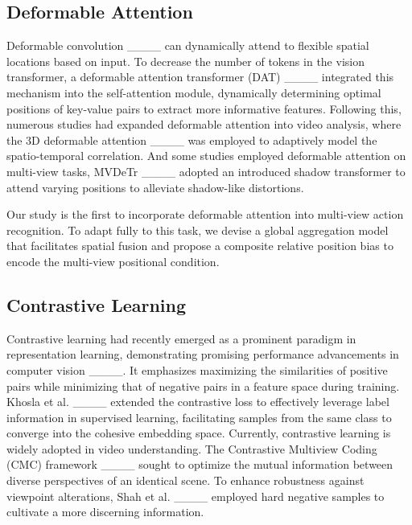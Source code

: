 \subsection{Deformable Attention}
Deformable convolution ____ can dynamically attend to flexible spatial locations based on input.
To decrease the number of tokens in the vision transformer, a deformable attention transformer (DAT) ____ integrated this mechanism into the self-attention module, dynamically determining optimal positions of key-value pairs to extract more informative features. 
Following this, numerous studies had expanded deformable attention into video analysis, where the 3D deformable attention ____ was employed to adaptively model the spatio-temporal correlation. 
And some studies employed deformable attention on multi-view tasks,
MVDeTr ____ adopted an introduced shadow transformer to attend varying positions to alleviate shadow-like distortions.

Our study is the first to incorporate deformable attention into multi-view action recognition. To adapt fully to this task, we devise a global aggregation model that facilitates spatial fusion and propose a composite relative position bias to encode the multi-view positional condition.

\subsection{Contrastive Learning}
Contrastive learning had recently emerged as a prominent paradigm in representation learning, demonstrating promising performance advancements in computer vision ____.
It emphasizes maximizing the similarities of positive pairs while minimizing that of negative pairs in a feature space during training.
Khosla et al. ____ extended the contrastive loss to effectively leverage label information in supervised learning, facilitating samples from the same class to converge into the cohesive embedding space.
Currently, contrastive learning is widely adopted in video understanding.
The Contrastive Multiview Coding (CMC) framework ____ sought to optimize the mutual information between diverse perspectives of an identical scene.
To enhance robustness against viewpoint alterations, Shah et al. ____  employed hard negative samples to cultivate a more discerning information.%

